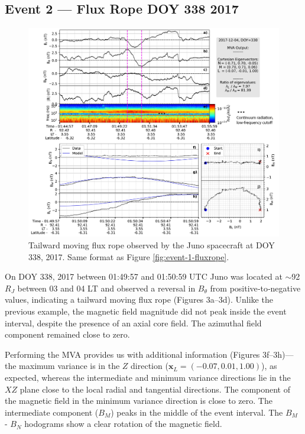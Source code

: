 \subsection{Event 2 — Flux Rope DOY 338 2017}

\begin{figure}
    \centering
    \includegraphics[width=\textwidth]{images6/event-2-fluxrope.jpg}
    \caption{Tailward moving flux rope observed by the Juno spacecraft at DOY 338, 2017. Same format as Figure \ref{fig:event-1-fluxrope}.}
    \label{fig:event-2-fluxrope}
\end{figure}

On DOY 338, 2017 between 01:49:57 and 01:50:59 UTC Juno was located at $\sim$92 $R_J$ between 03 and 04 LT and observed a reversal in $B_\theta$ from positive‐to‐negative values, indicating a tailward moving flux rope (Figures 3a–3d). Unlike the previous example, the magnetic field magnitude did not peak inside the event interval, despite the presence of an axial core field. The azimuthal field component remained close to zero.

Performing the MVA provides us with additional information (Figures 3f–3h)—the maximum variance is in the $Z$ direction ($\mathbf{x}_L=(-0.07,0.01,1.00)$), as expected, whereas the intermediate and minimum variance directions lie in the $XZ$ plane close to the local radial and tangential directions. The component of the magnetic field in the minimum variance direction is close to zero. The intermediate component ($B_M$) peaks in the middle of the event interval. The $B_M$ - $B_N$ hodograms show a clear rotation of the magnetic field.


